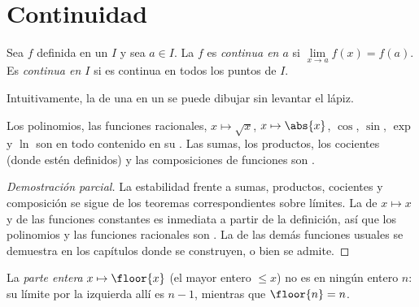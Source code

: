 \section{Continuidad}

\begin{definition}[Continuidad]\label{def:g12:limcont:continuity}
Sea $f$ definida en un  $I$ y sea $a \in I$. La  $f$ es
\emph{continua en $a$} si
$\lim\limits_{x \to a} f(x) = f(a)$. Es \emph{continua en
$I$} si es continua en todos los puntos de $I$.
\end{definition}

Intuitivamente, la  de una   en un  se puede
dibujar sin levantar el lápiz.

\begin{proposition}\label{prop:g12:limcont:usual}
Los polinomios, las funciones racionales, $x \mapsto \sqrt{x}$,
$x \mapsto \abs{x}$, $\cos$, $\sin$, $\exp$ y $\ln$ son  en todo
 contenido en su . Las sumas, los productos, los cocientes
(donde estén definidos) y las composiciones de funciones  son
.
\end{proposition}

\begin{proof}[Demostración parcial]
La estabilidad frente a sumas, productos, cocientes y composición se sigue
de los teoremas correspondientes sobre límites. La  de
$x \mapsto x$ y de las funciones constantes es inmediata a partir de la
definición, así que los polinomios y las funciones racionales son
. La  de las demás funciones usuales se demuestra en
los capítulos donde se construyen, o bien se admite.
\end{proof}

\begin{example}
La \emph{ parte entera} $x \mapsto \floor{x}$ (el mayor entero
$\leq x$) no es  en ningún entero $n$: su límite por la izquierda
allí es $n - 1$, mientras que $\floor{n} = n$.
\end{example}

